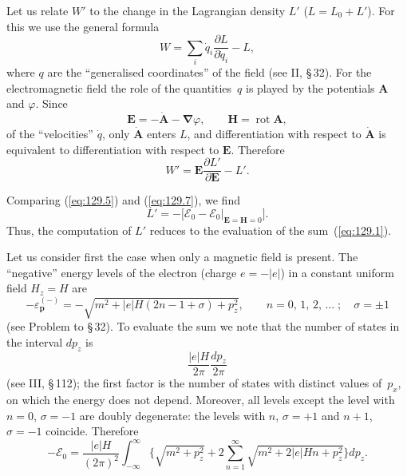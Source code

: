 Let us relate $W'$ to the change in the Lagrangian density $L'$ ($L = L_0 + L'$). For this we use the general formula
\[
W = \sum_i \dot{q}_i\frac{\partial L}{\partial\dot{q}_i} - L,
\]
where $q$ are the ``generalised coordinates'' of the field (see II, \S\,32). For the electromagnetic field the role of the quantities~$q$ is played by the potentials $\mathbf{A}$ and $\varphi$. Since
\begin{equation}
\mathbf{E} = -\dot{\mathbf{A}} - \boldsymbol{\nabla}\varphi,\qquad \mathbf{H} = \operatorname{rot}\mathbf{A},
\label{eq:129.6}
\end{equation}
of the ``velocities'' $\dot{q}$, only $\dot{\mathbf{A}}$ enters $L$, and differentiation with respect to $\dot{\mathbf{A}}$ is equivalent to differentiation with respect to $\mathbf{E}$. Therefore
\begin{equation}
W' = \mathbf{E}\frac{\partial L'}{\partial\mathbf{E}} - L'.
\label{eq:129.7}
\end{equation}


Comparing (\ref{eq:129.5}) and (\ref{eq:129.7}), we find
\begin{equation}
L' = -\bigl[\mathcal{E}_0 - \mathcal{E}_0\big|_{\mathbf{E}=\mathbf{H}=0}\bigr].
\label{eq:129.8}
\end{equation}
Thus, the computation of $L'$ reduces to the evaluation of the sum~(\ref{eq:129.1}).

Let us consider first the case when only a magnetic field is present. The ``negative'' energy levels of the electron (charge $e = -|e|$) in a constant uniform field $H_z = H$ are
\begin{equation}
-\varepsilon_{\mathbf{p}}^{(-)} = -\sqrt{m^2 + |e|H(2n-1+\sigma)+p_z^2},\qquad n=0,\,1,\,2,\,\ldots\;;\quad \sigma = \pm 1
\label{eq:129.9}
\end{equation}
(see Problem to \S\,32). To evaluate the sum we note that the number of states in the interval $dp_z$ is
\[
\frac{|e|H}{2\pi}\frac{dp_z}{2\pi}
\]
(see III, \S\,112); the first factor is the number of states with distinct values of~$p_x$, on which the energy does not depend. Moreover, all levels except the level with $n=0$, $\sigma = -1$ are doubly degenerate: the levels with $n$, $\sigma = +1$ and $n+1$, $\sigma = -1$ coincide. Therefore
\begin{equation}
-\mathcal{E}_0 = \frac{|e|H}{(2\pi)^2}\int_{-\infty}^{\infty}\biggl\{\sqrt{m^2+p_z^2}+2\sum_{n=1}^{\infty}\sqrt{m^2+2|e|Hn+p_z^2}\biggr\}dp_z.
\label{eq:129.10}
\end{equation}


